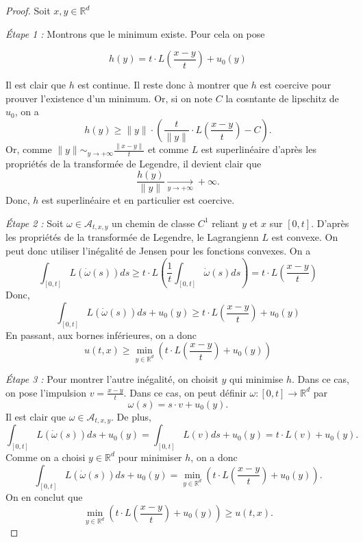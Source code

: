 \documentclass[10pt]{article}
\newcommand{\R}{\mathbb{R}}
\newcommand{\aA}{\mathcal{A}}
\begin{document}
\begin{proof}
	Soit $x,y \in \R^d$

	\medskip

	\emph{Étape 1 : } Montrons que le minimum existe. Pour cela on pose

	\[
		h(y) = t \cdot L \left(\frac{x-y}{t}\right) + u_0(y)
	\]

	Il est clair que $h$ est continue. Il reste donc à montrer que $h$ est coercive pour prouver l'existence d'un minimum. Or, si on note $C$ la cosntante de lipschitz de $u_0$, on a
	\[
		h(y) \ge \|y\| \cdot \left (
		\frac{t}{\|y\|} \cdot L\left(\frac{x-y}{t}\right) -  C
		\right).
	\]
	Or, comme  $\|y\| \sim_{y \to +\infty} \frac{\|x-y\|}{t}$ et comme $L$ est superlinéaire d'après les propriétés de la transformée de Legendre, il devient clair que
	\[
		\frac{h(y)}{\|y\|} \xrightarrow[y \to +\infty]{} +\infty.
	\]
	Donc, $h$ est superlinéaire et en particulier est coercive.

	\medskip

	\emph{Étape 2 : } Soit $\omega \in \aA_{t,x,y}$ un chemin de classe $C^1$ reliant $y$ et $x$ sur $[0,t]$. D'après les propriétés de la transformée de Legendre,
	le Lagrangienn $L$ est convexe. On peut donc utiliser l'inégalité de Jensen pour les fonctions convexes. On a
	\[
		\displaystyle\int_{[0,t]}^{} L(\dot{\omega}(s)) ds \ge
		t \cdot L\left(\frac{1}{t}\displaystyle\int_{[0,t]}^{}   \dot{\omega}(s) ds\right)
		= t \cdot L\left(\frac{x-y}{t}\right)
	\]
	Donc,
	\[
		\displaystyle\int_{[0,t]}^{} L(\dot{\omega}(s)) ds + u_0(y) \ge
		t \cdot L\left(\frac{x-y}{t}\right) + u_0(y)
	\]
	En passant, aux bornes inférieures, on a donc
	\[
		u(t,x) \ge
		\min_{y \in \R^d} \left( t \cdot L\left(\frac{x-y}{t}\right) + u_0(y) \right)
	\]

	\medskip

	\emph{Étape 3 : } Pour montrer l'autre inégalité, on choisit $y$ qui minimise $h$. Dans ce cas, on pose l'impulsion $v = \frac{x-y}{t}$. Dans ce cas, on peut définir
	$\omega : [0,t] \to \R^d$ par
	\[
		\omega(s) = s \cdot v + u_0(y).
	\]
	Il est clair que $\omega \in \aA_{t,x,y}$. De plus,
	\[
		\displaystyle\int_{[0,t]}^{} L(\dot{\omega}(s)) ds + u_0(y) =
		\displaystyle\int_{[0,t]}^{} L(v) ds + u_0(y) =
		t \cdot L\left(v\right) + u_0(y).
	\]
	Comme on a choisi $y \in \R^d$ pour minimiser $h$, on a donc
	\[
		\displaystyle\int_{[0,t]}^{} L(\dot{\omega}(s)) ds + u_0(y) =
		\min_{y \in \R^d} \left( t \cdot L\left(\frac{x-y}{t}\right) + u_0(y) \right).
	\]
	On en conclut que
	\[
		\min_{y \in \R^d} \left( t \cdot L\left(\frac{x-y}{t}\right) + u_0(y) \right)
		\ge
		u(t,x).
	\]
\end{proof}
\end{document}
